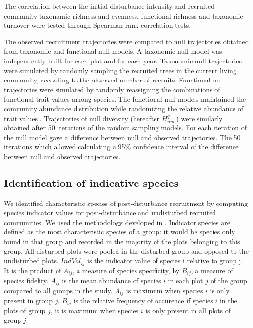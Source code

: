 \documentclass[fleqn,10pt]{ArtEcoFoG} %
\begin{document}
The correlation between the initial disturbance intensity and recruited
community taxonomic richness and evenness, functional richness and
taxonomic turnover were tested through Spearman rank correlation tests.
\color{black}

The observed recruitment trajectories were compared to null trajectories
obtained from taxonomic and functional null models. A taxonomic null
model was independently built for each plot and for each year. Taxonomic
null trajectories were simulated by randomly sampling the recruited
trees in the current living community, according to the observed number
of recruits. Functional null trajectories were simulated by randomly
reassigning the combinations of functional trait values among species.
The functional null models maintained the community abundance
distribution while randomizing the relative abundance of trait values
\citep{Mason2013}. Trajectories of null diversity (hereafter
\(H^q_{null}\)) were similarly obtained after 50 iterations of the
random sampling models. For each iteration of the null model gave a
difference between null and observed trajectories. The 50 iterations
which allowed calculating a 95\% confidence interval of the difference
between null and observed trajectories.

\color{red}

\subsection{Identification of indicative
species}\label{identification-of-indicative-species}

We identified characteristic species of post-disturbance recruitment by
computing species indicator values for post-disturbance and undisturbed
recruited communities. We used the methodology developed in
\citet{Dufrene1997}. Indicator species are defined as the most
characteristic species of a group: it would be species only found in
that group and recorded in the majority of the plots belonging to this
group. All disturbed plots were pooled in the disturbed group and
opposed to the undisturbed plots. \(IndVal_{ij}\) is the indicator value
of species i relative to group j. It is the product of \(A_{ij}\), a
measure of species specificity, by \(B_{ij}\), a measure of species
fidelity. \(A_{ij}\) is the mean abundance of species \(i\) in each plot
\(j\) of the group compared to all groups in the study. \(A_{ij}\) is
maximum when species \(i\) is only present in group \(j\). \(B_{ij}\) is
the relative frequency of occurence if species \(i\) in the plots of
group \(j\), it is maximum when species \(i\) is only present in all
plots of group \(j\).
\end{document}
